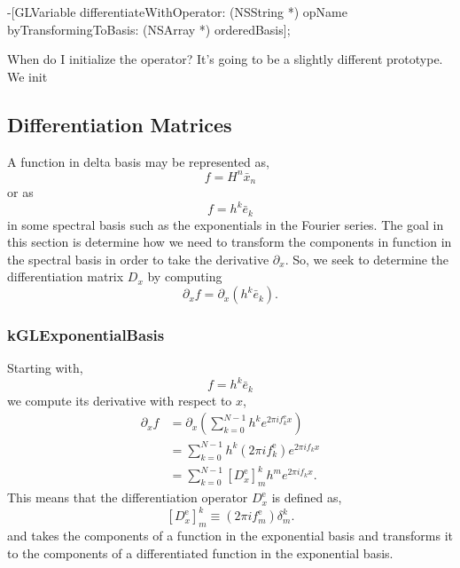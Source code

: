 \documentclass[11pt]{article}
\begin{document}
-[GLVariable differentiateWithOperator: (NSString *) opName byTransformingToBasis: (NSArray *) orderedBasis];

When do I initialize the operator? It's going to be a slightly different prototype. We init

%
\subsection{Differentiation Matrices}
%

A function in delta basis may be represented as,
\begin{equation}
f = H^n \bar{x}_n
\end{equation}
or as
\begin{equation}
f = h^k \bar{e}_k
\end{equation}
in some spectral basis such as the exponentials in the Fourier series. The goal in this section is determine how we need to transform the components in function in the spectral basis in order to take the derivative $\partial_x$. So, we seek to determine the differentiation matrix $D_x$ by computing
\begin{equation}
\partial_x f= \partial_x\left( h^k \bar{e}_k \right).
\end{equation}

\subsubsection{kGLExponentialBasis}
Starting with,
\begin{equation}
f = h^k \bar{e}_k
\end{equation}
we compute its derivative with respect to $x$,
\begin{align}
\partial_x f &= \partial_x  \left( \sum_{k=0}^{N-1} h^k e^{2\pi i f_k^{\textrm{e}} x} \right)\\
&=  \sum_{k=0}^{N-1} h^k (2 \pi i f_k^{\textrm{e}} ) e^{2\pi i f_k x} \\
& =  \sum_{k=0}^{N-1} \left[D_x^{\textrm{e}} \right]^k_m h^m e^{2\pi i f_k x}.
\end{align}
This means that the differentiation operator $D_x^{\textrm{e}}$ is defined as,
\begin{equation}
\left[D_x^{\textrm{e}} \right]^k_m \equiv \left( 2 \pi i f_m^{\textrm{e}} \right) \delta_{m}^k .
\end{equation}
and takes the components of a function in the exponential basis and transforms it to the components of a differentiated function in the exponential basis.
\end{document}
